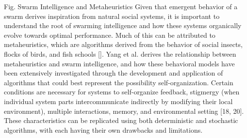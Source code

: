 Fig. 
Swarm Intelligence and Metaheuristics
Given that emergent behavior of a swarm derives inspiration from natural social systems, it is important to understand the root of swarming intelligence and how these systems organically evolve towards optimal performance. Much of this can be attributed to metaheuristics, which are algorithms derived from the behavior of social insects, flocks of birds, and fish schools []. Yang et al. derives the relationship between metaheuristics and swarm intelligence, and how these behavioral models have been extensively investigated through the development and application of algorithms that could best represent the possibility self-organization. Certain conditions are necessary for systems to self-organize feedback, stigmergy (when individual system parts intercommunicate indirectly by modifying their local environment), multiple interactions, memory, and environmental setting [18, 20]. These characteristics can be replicated using both deterministic and stochastic algorithms, with each having their own drawbacks and limitations. 
